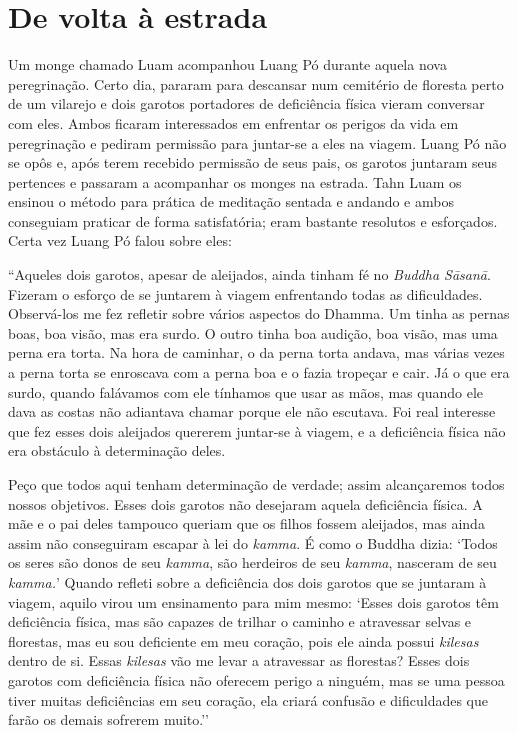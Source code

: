 \chapter{De volta à estrada}

Um monge chamado Luam acompanhou Luang Pó durante aquela nova
peregrinação. Certo dia, pararam para descansar num cemitério de
floresta perto de um vilarejo e dois garotos portadores de deficiência
física vieram conversar com eles. Ambos ficaram interessados em
enfrentar os perigos da vida em peregrinação e pediram permissão para
juntar-se a eles na viagem. Luang Pó não se opôs e, após terem recebido
permissão de seus pais, os garotos juntaram seus pertences e passaram a
acompanhar os monges na estrada. Tahn Luam os ensinou o método para
prática de meditação sentada e andando e ambos conseguiam praticar de
forma satisfatória; eram bastante resolutos e esforçados. Certa vez
Luang Pó falou sobre eles:

``Aqueles dois garotos, apesar de aleijados, ainda tinham fé no
\emph{Buddha Sāsanā}. Fizeram o esforço de se juntarem à viagem
enfrentando todas as dificuldades. Observá-los me fez refletir sobre
vários aspectos do Dhamma. Um tinha as pernas boas, boa visão, mas era
surdo. O outro tinha boa audição, boa visão, mas uma perna era torta. Na
hora de caminhar, o da perna torta andava, mas várias vezes a perna
torta se enroscava com a perna boa e o fazia tropeçar e cair. Já o que
era surdo, quando falávamos com ele tínhamos que usar as mãos, mas
quando ele dava as costas não adiantava chamar porque ele não escutava.
Foi real interesse que fez esses dois aleijados quererem juntar-se à
viagem, e a deficiência física não era obstáculo à determinação deles.

Peço que todos aqui tenham determinação de verdade; assim alcançaremos
todos nossos objetivos. Esses dois garotos não desejaram aquela
deficiência física. A mãe e o pai deles tampouco queriam que os filhos
fossem aleijados, mas ainda assim não conseguiram escapar à lei do
\emph{kamma}. É como o Buddha dizia: `Todos os seres são donos de seu
\emph{kamma}, são herdeiros de seu \emph{kamma}, nasceram de seu
\emph{kamma.}' Quando refleti sobre a deficiência dos dois garotos que
se juntaram à viagem, aquilo virou um ensinamento para mim mesmo: `Esses
dois garotos têm deficiência física, mas são capazes de trilhar o
caminho e atravessar selvas e florestas, mas eu sou deficiente em meu
coração, pois ele ainda possui \emph{kilesas} dentro de si. Essas
\emph{kilesas} vão me levar a atravessar as florestas? Esses dois
garotos com deficiência física não oferecem perigo a ninguém, mas se uma
pessoa tiver muitas deficiências em seu coração, ela criará confusão e
dificuldades que farão os demais sofrerem muito.''

